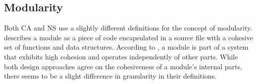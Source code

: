 \subsection{Modularity} \label{subsec_modularity}

Both CA and NS use a slightly different definitions for the concept of modularity.
\textcite[82]{robert_c_martin_clean_2018} describes a module as a piece of code
encapsulated in a source file with a cohesive set of functions and data structures.
According to \textcite[22]{mannaert_normalized_2016}, a module is part of a system that
exhibits high cohesion and operates independently of other parts.  While both design
approaches agree on the cohesiveness of a module's internal parts, there seems to be a
slight difference in granularity in their definitions.